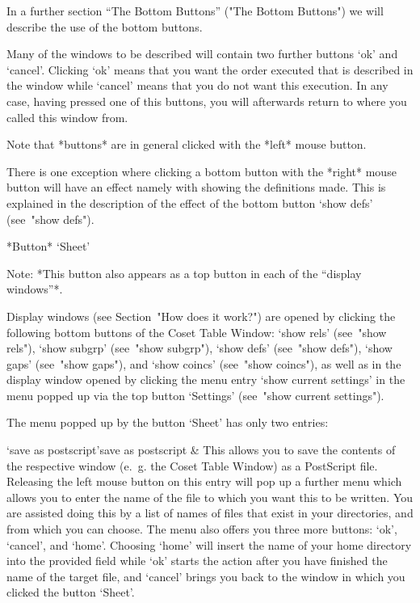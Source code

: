 In a further section ``The Bottom Buttons'' ("The Bottom Buttons") we
will describe the use of the bottom buttons.

Many of the windows to be described will contain two further buttons
`ok' and `cancel'. Clicking `ok' means that you want the order
executed that is described in the window while `cancel' means that you
do not want this execution. In any case, having pressed one of this
buttons, you will afterwards return to where you called this window
from.

Note that *buttons* are in general clicked with the *left* mouse
button.

There is one exception where clicking a bottom button with the
*right* mouse button will have an effect namely with showing the
definitions made. This is explained in the description of the effect
of the bottom button `show defs' (see~"show defs").



*Button* `Sheet'

Note: *This button also appears as a top button in each of the
``display windows''*.

Display windows (see Section~"How does it work?") are opened by
clicking the following bottom buttons of the Coset Table Window:
`show rels' (see~"show rels"), `show subgrp' (see~"show subgrp"),
`show defs' (see~"show defs"), `show gaps' (see~"show gaps"), and
`show coincs' (see~"show coincs"), as well as in the display window
opened by clicking the menu entry `show current settings' in the
menu popped up via the top button `Settings' (see~"show current
settings").

The menu popped up by the button `Sheet' has only two entries:

\beginitems

\>`save as postscript'{save as postscript} &
  This allows you to save the contents of the respective window (e.~g.
  the Coset Table Window) as a PostScript file. Releasing the left
  mouse button on this entry will pop up a further menu which allows you
  to enter the name of the file to which you want this to be written.
  You are assisted doing this by a list of names of files that exist in
  your directories, and from which you can choose. The menu also offers
  you three more buttons: `ok', `cancel', and `home'. Choosing `home'
  will insert the name of your home directory into the provided field
  while `ok' starts the action after you have finished the name of the
  target file, and `cancel' brings you back to the window in which you
  clicked the button `Sheet'.

